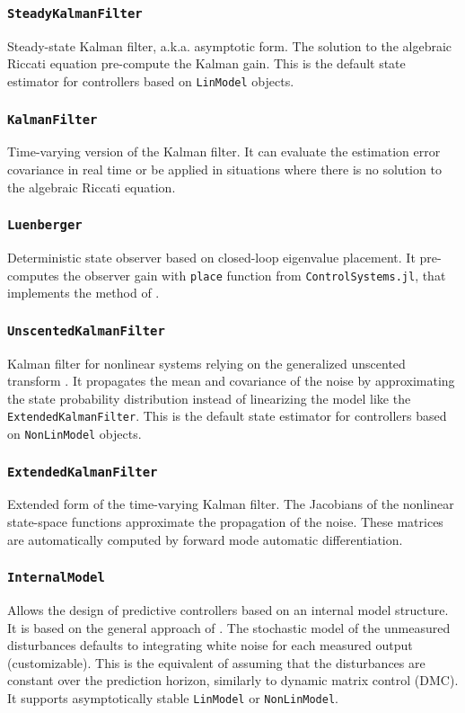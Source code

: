 \subsubsection{\textnormal{\texttt{SteadyKalmanFilter}}}
Steady-state Kalman filter, a.k.a. asymptotic form. The solution to the algebraic Riccati equation pre-compute the Kalman gain. This is the default state estimator for controllers based on \texttt{LinModel} objects.

\subsubsection{\textnormal{\texttt{KalmanFilter}}}
Time-varying version of the Kalman filter. It can evaluate the estimation error covariance in real time or be applied in situations where there is no solution to the algebraic Riccati equation.

\subsubsection{\textnormal{\texttt{Luenberger}}}
Deterministic state observer based on closed-loop eigenvalue placement. It pre-computes the observer gain with \texttt{place} function from \texttt{ControlSystems.jl}, that implements the method of \citet{placePoles}.

\subsubsection{\textnormal{\texttt{UnscentedKalmanFilter}}}
Kalman filter for nonlinear systems relying on the generalized unscented transform \citep{kalmanBook}. It propagates the mean and covariance of the noise by approximating the state probability distribution instead of linearizing the model like the \texttt{ExtendedKalmanFilter}. This is the default state estimator for controllers based on \texttt{NonLinModel} objects.

\subsubsection{\textnormal{\texttt{ExtendedKalmanFilter}}}
Extended form of the time-varying Kalman filter. The Jacobians of the nonlinear state-space functions approximate the propagation of the noise. These matrices are automatically computed by forward mode automatic differentiation.

\subsubsection{\textnormal{\texttt{InternalModel}}}
Allows the design of predictive controllers based on an internal model structure. It is based on the general approach of \citet{globPC}. The stochastic model of the unmeasured disturbances defaults to integrating white noise for each measured output (customizable). This is the equivalent of assuming that the disturbances are constant over the prediction horizon, similarly to dynamic matrix control (DMC). It supports asymptotically stable \texttt{LinModel} or \texttt{NonLinModel}.


